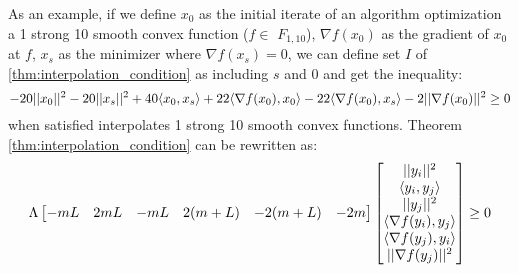 As an example, if we define $x_0$ as the initial iterate of an algorithm optimization a 1 strong 10 smooth convex function (\(f \in \) \(F_{1,10}\)), $\nabla f(x_0)$ as the gradient of $x_0$ at $f$, $x_s$ as the minimizer where  $\nabla f(x_s) = 0$, we can define set $I$ of \ref{thm:interpolation_condition} as including $s$ and $0$ and get the inequality:
\begin{equation} \label{eqn:int_cond}
	-20||x_0||^2 -20||x_s||^2 + 40\langle x_0, x_s \rangle + 22\langle \nabla f(x_0), x_0 \rangle - 22\langle \nabla f(x_0), x_s \rangle - 2||\nabla f(x_0)||^2 \geq 0
\end{equation}
when satisfied interpolates 1 strong 10 smooth convex functions. Theorem \ref{thm:interpolation_condition} can be rewritten as:
\begin{equation} \label{eqn:int_cond2}
	\Lambda\begin{bmatrix}-mL & 2mL & -mL & 2(m+L) & -2(m+L) & -2m\end{bmatrix}\begin{bmatrix}||y_i||^2 \\ \langle y_i, y_j \rangle \\ ||y_j||^2 \\ \langle \nabla f(y_i), y_j \rangle \\ \langle \nabla f(y_j), y_i \rangle \\ ||\nabla f(y_j)||^2\end{bmatrix} \geq 0
\end{equation}


